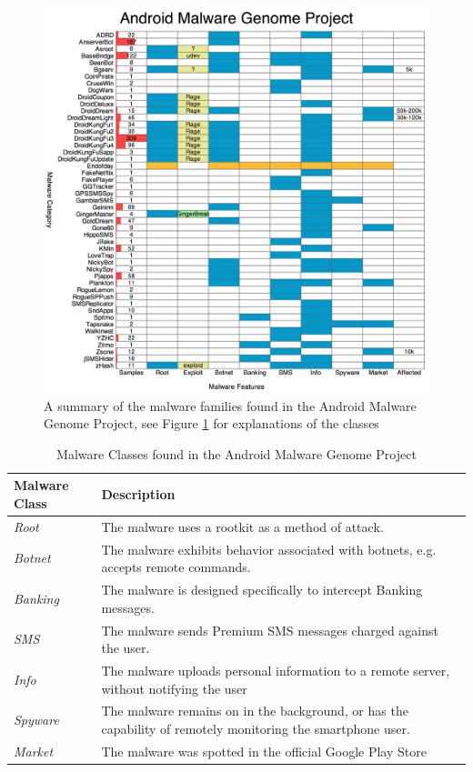 \begin{figure}[h]
\begin{center}
\includegraphics[width=0.85\columnwidth]{figs/NCSUMalwareDataset}
\caption{A summary of the malware families found in the Android Malware Genome Project, see Figure \ref{tab:malwaredbcategories} for explanations of the classes}
\label{fig:malwaredboverview}
\end{center}
\end{figure}

\begin{table}[h]
\begin{small}
\begin{tabular}{p{3cm}|p{12.5cm}}
Malware Class & Description \\
\hline

\textit{Root} & The malware uses a rootkit as a method of attack.    \\
\textit{Botnet} & The malware exhibits behavior associated with botnets, e.g. accepts remote commands.    \\
\textit{Banking} & The malware is designed specifically to intercept Banking messages.    \\
\textit{SMS} & The malware sends Premium SMS messages charged against the user.    \\
\textit{Info} &  The malware uploads personal information to a remote server, without notifying the user   \\
\textit{Spyware} & The malware remains on in the background, or has the capability of remotely monitoring the smartphone user.    \\
\textit{Market} &  The malware was spotted in the official Google Play Store   \\

\end{tabular}
\end{small}
\caption{Malware Classes found in the Android Malware Genome Project}
\label{tab:malwaredbcategories}
\end{table}


